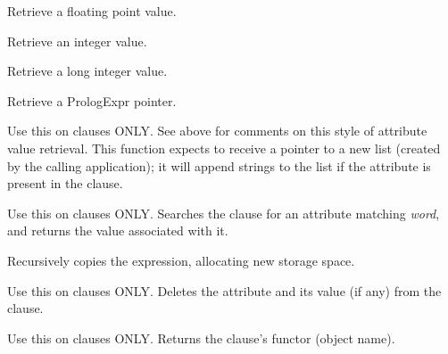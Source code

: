 
Retrieve a floating point value.


Retrieve an integer value.


Retrieve a long integer value.


Retrieve a PrologExpr pointer.



Use this on clauses ONLY. See above for comments on this style of
attribute value retrieval. This function expects to receive a pointer to
a new list (created by the calling application); it will append strings
to the list if the attribute is present in the clause.



Use this on clauses ONLY. Searches the clause for an attribute
matching {\it word}, and returns the value associated with it.



Recursively copies the expression, allocating new storage space.



Use this on clauses ONLY. Deletes the attribute and its value (if any) from the
clause.



Use this on clauses ONLY. Returns the clause's functor (object name).


